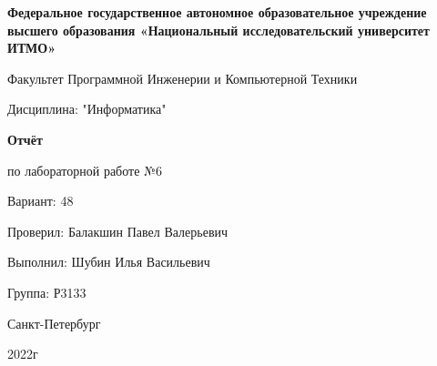 \thispagestyle{empty}
\begin{figure*}
\large
\begin{center}
\textbf{Федеральное государственное автономное образовательное учреждение высшего образования «Национальный исследовательский университет ИТМО»}
\bigskip

Факультет Программной Инженерии и Компьютерной Техники 
\bigskip

Дисциплина: "Информатика"
\vspace{8cm}

\textbf{\Large Отчёт}
\bigskip

по лабораторной работе №6
\bigskip

Вариант: 48
\vspace{5cm}

\end{center}
\begin{flushright}
Проверил: Балакшин Павел Валерьевич

Выполнил: Шубин Илья Васильевич

Группа: Р3133
\vspace{4cm}

\end{flushright}
\begin{center}
Санкт-Петербург
    
2022г
\end{center}
\newpage
\end{figure*}